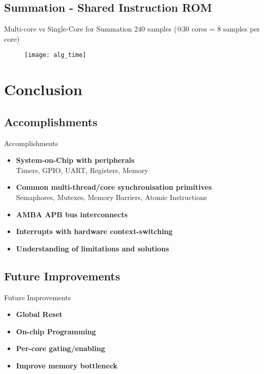 \documentclass[aspectratio=169]{beamer}
\begin{document}
\subsection{Summation - Shared Instruction ROM}
\begin{frame}{Multi-core vs Single-Core for Summation}
240 samples (@30 cores = 8 samples per core)
\begin{figure}
    \centering
    \texttt{[image: alg\_time]}
\end{figure}
\end{frame}


\section{Conclusion}
\frame{\tableofcontents[currentsection, subsectionstyle=show/show/hide]}

\subsection{Accomplishments}
\begin{frame}{Accomplishments}
\begin{itemize}\setlength{\itemsep 1em}
    \item \textbf{System-on-Chip with peripherals}\\
    Timers, GPIO, UART, Registers, Memory
    
    \item \textbf{Common multi-thread/core synchronisation primitives}\\
    Semaphores, Mutexes, Memory Barriers, Atomic Instructions
    
    \item \textbf{AMBA APB bus interconnects}
    
    \item \textbf{Interrupts with hardware context-switching}
    
    \item \textbf{Understanding of limitations and solutions}
\end{itemize}
\end{frame}

\subsection{Future Improvements}
\begin{frame}{Future Improvements}

\begin{itemize}\setlength{\itemsep 1em}
    \item \textbf{Global Reset}
    
    \item \textbf{On-chip Programming}
    
    \item \textbf{Per-core gating/enabling}
    
    \item \textbf{Improve memory bottleneck}
\end{itemize}
\end{frame}
\end{document}
